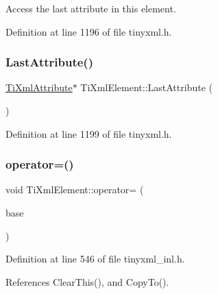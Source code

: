 Access the last attribute in this element. 



Definition at line 1196 of file tinyxml.\+h.

\hypertarget{class_ti_xml_element_a222f81cf06155cd108f2a68d4d176004}{}\label{class_ti_xml_element_a222f81cf06155cd108f2a68d4d176004} 
\subsubsection{\texorpdfstring{Last\+Attribute()}{LastAttribute()}\hspace{0.1cm}{\footnotesize\ttfamily [2/2]}}
{\footnotesize\ttfamily \hyperlink{class_ti_xml_attribute}{Ti\+Xml\+Attribute}$\ast$ Ti\+Xml\+Element\+::\+Last\+Attribute (\begin{DoxyParamCaption}{ }\end{DoxyParamCaption})\hspace{0.3cm}{\ttfamily [inline]}}



Definition at line 1199 of file tinyxml.\+h.

\hypertarget{class_ti_xml_element_af5cd4156e082ef3bf23adfe0ed173340}{}\label{class_ti_xml_element_af5cd4156e082ef3bf23adfe0ed173340} 
\subsubsection{\texorpdfstring{operator=()}{operator=()}}
{\footnotesize\ttfamily void Ti\+Xml\+Element\+::operator= (\begin{DoxyParamCaption}\item[{const \hyperlink{class_ti_xml_element}{Ti\+Xml\+Element} \&}]{base }\end{DoxyParamCaption})}



Definition at line 546 of file tinyxml\+\_\+inl.\+h.



References Clear\+This(), and Copy\+To().

\hypertarget{class_ti_xml_element_af95c9165159fd9dfdcc5b894a3fcf85b}{}\label{class_ti_xml_element_af95c9165159fd9dfdcc5b894a3fcf85b} 
